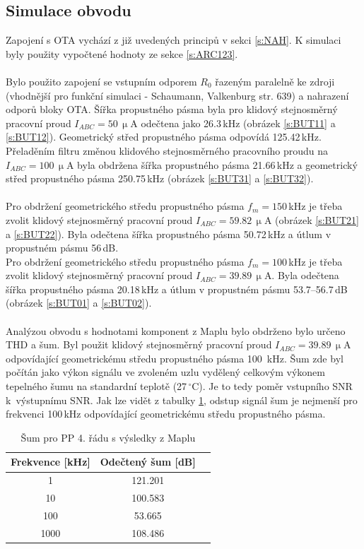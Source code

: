 \subsection{Simulace obvodu}
\noindent  Zapojení s OTA vychází z již uvedených principů v sekci \ref{s:NAH}. K simulaci byly použity vypočtené hodnoty ze sekce \ref{s:ARC123}. \\
\\
\noindent Bylo použito zapojení se vstupním odporem $R_0$ řazeným paralelně ke zdroji (vhodnější pro funkční simulaci - Schaumann, Valkenburg \cite{13} str. 639) a nahrazení odporů bloky OTA. Šířka propustného pásma byla pro klidový stejnosměrný pracovní proud $I_{ABC} = 50$\,$\upmu$A odečtena jako 26.3\,kHz (obrázek \ref{s:BUT11} a \ref{s:BUT12}). Geometrický střed propustného pásma odpovídá 125.42\,kHz. Přeladěním filtru změnou klidového stejnosměrného pracovního proudu na $I_{ABC} = 100$\,$\upmu$A byla obdržena šířka propustného pásma 21.66\,kHz a geometrický střed propustného pásma 250.75\,kHz (obrázek \ref{s:BUT31} a \ref{s:BUT32}). \\
\\
Pro obdržení geometrického středu propustného pásma $f_m = 150$\,kHz je třeba zvolit klidový stejnosměrný pracovní proud $I_{ABC} = 59.82$\,$\upmu$A (obrázek \ref{s:BUT21} a \ref{s:BUT22}). Byla odečtena šířka propustného pásma 50.72\,kHz a útlum v propustném pásmu 56\,dB. \\
Pro obdržení geometrického středu propustného pásma $f_m = 100$\,kHz je třeba zvolit klidový stejnosměrný pracovní proud $I_{ABC} = 39.89$\,$\upmu$A. Byla odečtena šířka propustného pásma 20.18\,kHz a útlum v propustném pásmu 53.7--56.7\,dB (obrázek \ref{s:BUT01} a \ref{s:BUT02}).\\
\\
Analýzou obvodu s hodnotami komponent z Maplu bylo obdrženo bylo určeno THD a šum. Byl použit klidový stejnosměrný pracovní proud $I_{ABC} = 39.89$\,$\upmu$A odpovídající geometrickému středu propustného pásma 100~kHz. Šum zde byl počítán jako výkon signálu ve zvoleném uzlu vydělený celkovým výkonem tepelného šumu na standardní teplotě (27\,$^{\circ}$C). Je to tedy poměr vstupního SNR k~výstupnímu SNR. Jak lze vidět z tabulky \ref{s:THD111}, odstup signál šum je nejmenší pro frekvenci 100\,kHz odpovídající geometrickému středu propustného pásma.
\begin{table}[h]
\centering
  \begin{tabular}{ | c | c | c |}
    \hline
     Frekvence [kHz] & Odečtený šum [dB] \\ \hline
    1 & 121.201 \\ \hline
    10 & 100.583 \\ \hline
    100 & 53.665 \\ \hline
    1000 & 108.486 \\ \hline
  \end{tabular}
  \caption[Šum pro PP 4. řádu (Maple)]{Šum pro PP 4. řádu s výsledky z Maplu \label{s:THD111}}
\end{table}
